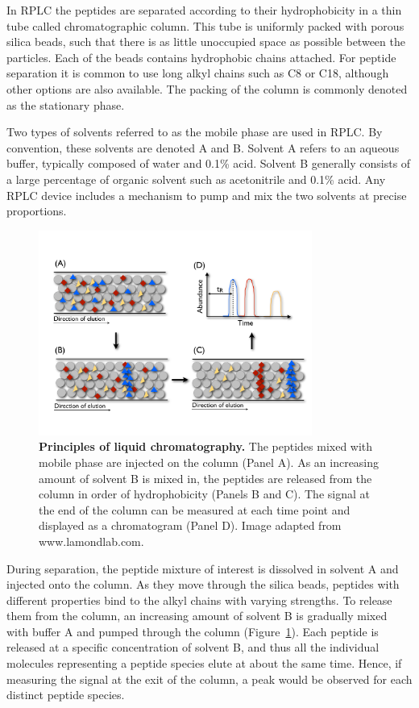 \documentclass[a4paper]{article}
\begin{document}
In RPLC the peptides are separated according to their hydrophobicity
in a thin tube called chromatographic column. This tube is uniformly
packed with porous silica beads, such that there is as little
unoccupied space as possible between the particles. Each of the beads
contains hydrophobic chains attached. For peptide separation it is
common to use long alkyl chains such as C8 or C18, although other
options are also available. The packing of the column is commonly
denoted as the stationary phase.

Two types of solvents referred to as the mobile phase are used in
RPLC. By convention, these solvents are denoted A and B. Solvent A
refers to an aqueous buffer, typically composed of water and 0.1\%
acid. Solvent B generally consists of a large percentage of organic
solvent such as acetonitrile and 0.1\% acid. Any RPLC device includes
a mechanism to pump and mix the two solvents at precise proportions.

\begin{figure}[p]
\centering
\includegraphics[trim=0.5cm 2.8cm 0.5cm 3.5cm, clip=true, width=0.8\textwidth]{img/rplc.pdf}
\caption{\label{fig:rplc} {\bf Principles of liquid chromatography.}
  The peptides mixed with mobile phase are injected on the column
  (Panel A). As an increasing amount of solvent B is mixed in, the
  peptides are released from the column in order of hydrophobicity
  (Panels B and C). The signal at the end of the column can be
  measured at each time point and displayed as a chromatogram (Panel
  D). Image adapted from www.lamondlab.com.}
\vspace{-7pt}
\end{figure}

During separation, the peptide mixture of interest is dissolved in
solvent A and injected onto the column. As they move through the
silica beads, peptides with different properties bind to the alkyl
chains with varying strengths. To release them from the column, an
increasing amount of solvent B is gradually mixed with buffer A and
pumped through the column (Figure~\ref{fig:rplc}). Each peptide is
released at a specific concentration of solvent B, and thus all the
individual molecules representing a peptide species elute at about the
same time.  Hence, if measuring the signal at the exit of the column,
a peak would be observed for each distinct peptide species.
\end{document}
